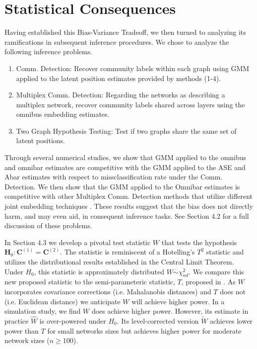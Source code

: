 \documentclass{article}
\newcommand{\bvar}[1]{\mathbf{#1}}
\theoremstyle{definition}
\numberwithin{Def}{section}
\begin{document}
\section{Statistical Consequences}

Having established this Bias-Variance Tradeoff, we then turned to analyzing its ramifications in subsequent inference procedures. 
We chose to analyze the following inference problems. 
\begin{enumerate}
    \item Comm. Detection: Recover community labels within each graph using GMM applied to the latent position estimates provided by methods (1-4). 
    \item Multiplex Comm. Detection: Regarding the networks as describing a multiplex network, recover community labels shared across layers using the omnibus embedding estimates. 
    \item Two Graph Hypothesis Testing: Test if two graphs share the same set of latent positions. 
\end{enumerate}

Through several numerical studies, we show that GMM applied to the omnibus and omnibar estimates are competitive with the GMM 
applied to the ASE and Abar estimates with respect to missclassification rate under the Comm. Detection. 
We then show that the GMM applied to the Omnibar estimates is competitive with other Multiplex Comm. Detection methods that utilize different joint embedding techniques \parencite{wang2017,arroyo2019,nielsen2018}. 
These results suggest that the bias does not directly harm, and may even aid, in consequent inference tasks. 
See Section 4.2 for a full discussion of these problems. 

In Section 4.3 we develop a pivotal test statistic $W$ that tests the hypothesis $\bvar{H}_0: \bvar{C}^{(1)} = \bvar{C}^{(2)}$. 
The statistic is reminiscent of a Hotelling's $T^2$ statistic and utilizes the distributional results established in the Central Limit Theorem. 
Under $H_0$, this statistic is approximately distributed $W\overset{\cdot}{\sim}\chi^2_{nd}$. 
We compare this new proposed statistic to the semi-parameteric statistic, $T$, proposed in \textcite{OmniCLT}.
As $W$ incorporates covariance corrections (i.e. Mahalanobis distances) and $T$ does not (i.e. Euclidean distance) we anticipate $W$ will achieve higher power. 
In a simulation study, we find $W$ does achieve higher power. 
However, its estimate in practice $\hat{W}$ is over-powered under $H_0$.
Its level-corrected version $\tilde{W}$ achieves lower power than $T$ for small networks sizes but achieves higher power for moderate network sizes ($n\geq 100$). 



\newpage{}
\printbibliography
\end{document}
